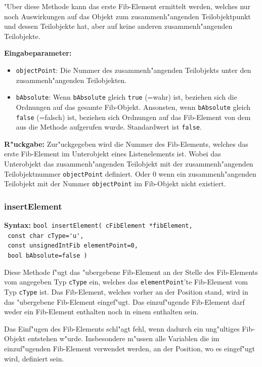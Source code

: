 "Uber diese Methode kann das erste Fib-Element ermittelt werden, welches nur noch Auswirkungen auf das Objekt zum zusammenh"angenden Teilobjektpunkt und dessen Teilobjekte hat, aber auf keine anderen zusammenh"angenden Teilobjekte.

\bigskip\noindent
\textbf{Eingabeparameter:}
\begin{itemize}
 \item \verb|objectPoint|: Die Nummer des zusammenh"angenden Teilobjekts unter den zusammenh"angenden Teilobjekten.
 \item \verb|bAbsolute|: Wenn \verb|bAbsolute| gleich \verb|true| (=wahr) ist, beziehen sich die Ordnungen auf das gesamte Fib-Objekt. Ansonsten, wenn \verb|bAbsolute| gleich \verb|false| (=falsch) ist, beziehen sich Ordnungen auf das Fib-Element von dem aus die Methode aufgerufen wurde. Standardwert ist \verb|false|.
\end{itemize}

\bigskip\noindent
\textbf{R"uckgabe:} Zur"uckgegeben wird die Nummer des Fib-Elements, welches das erste Fib-Element im Unterobjekt eines Listenelements ist. Wobei das Unterobjekt das zusammenh"angenden Teilobjekt mit der zusammenh"angenden Teilobjektnummer \verb|objectPoint| definiert. Oder $0$ wenn ein zusammenh"angenden Teilobjekt mit der Nummer \verb|objectPoint| im Fib-Objekt nicht existiert.


\subsubsection{insertElement}

\textbf{Syntax:} \verb|bool insertElement( cFibElement *fibElement, | \\\verb| const char cType='u', | \\\verb| const unsignedIntFib elementPoint=0,| \\\verb| bool bAbsolute=false )|

\bigskip\noindent
Diese Methode f"ugt das "ubergebene Fib-Element an der Stelle des Fib-Elements vom angegeben Typ \verb|cType| ein, welches das \verb|elementPoint|'te Fib-Element vom Typ \verb|cType| ist. Das Fib-Element, welches vorher an der Position stand, wird in das "ubergebene Fib-Element eingef"ugt. Das einzuf"ugende Fib-Element darf weder ein Fib-Element enthalten noch in einem enthalten sein.

Das Einf"ugen des Fib-Elements schl"agt fehl, wenn dadurch ein ung"ultiges Fib-Objekt entstehen w"urde. Insbesondere m"ussen alle Variablen die im einzuf"ugenden Fib-Element verwendet werden, an der Position, wo es eingef"ugt wird, definiert sein.

